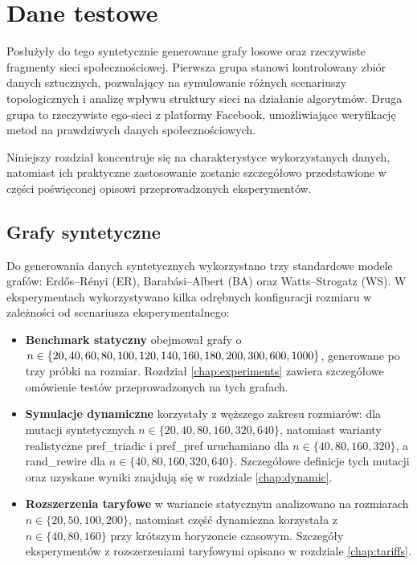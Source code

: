 \chapter{Dane testowe}\label{chap:testdata}
Posłużyły do tego syntetycznie generowane grafy losowe oraz rzeczywiste fragmenty sieci społecznościowej. Pierwsza grupa stanowi kontrolowany zbiór danych sztucznych, pozwalający na symulowanie różnych scenariuszy topologicznych i analizę wpływu struktury sieci na działanie algorytmów. Druga grupa to rzeczywiste ego-sieci z platformy Facebook, umożliwiające weryfikację metod na prawdziwych danych społecznościowych.

Niniejszy rozdział koncentruje się na charakterystyce wykorzystanych danych, natomiast ich praktyczne zastosowanie zostanie szczegółowo przedstawione w części poświęconej opisowi przeprowadzonych eksperymentów.

\section{Grafy syntetyczne}

Do generowania danych syntetycznych wykorzystano trzy standardowe modele grafów: Erd\H{o}s--Rényi (ER), Barabási--Albert (BA) oraz Watts--Strogatz (WS).
W eksperymentach wykorzystywano kilka odrębnych konfiguracji rozmiaru w zależności od scenariusza eksperymentalnego:
\begin{itemize}
  \item \textbf{Benchmark statyczny} obejmował grafy o $n \in \{20, 40, 60, 80, 100, 120, 140, 160, 180,\\200, 300, 600, 1000\}$, generowane po trzy próbki na rozmiar. Rozdział \ref{chap:experiments} zawiera szczegółowe omówienie testów przeprowadzonych na tych grafach.
  \item \textbf{Symulacje dynamiczne} korzystały z węższego zakresu rozmiarów: dla mutacji syntetycznych $n \in \{20, 40, 80, 160, 320, 640\}$, natomiast warianty realistyczne pref\_triadic i pref\_pref uruchamiano dla $n\in\{40,80,160,320\}$, a rand\_rewire dla $n\in\{40,80,160,320,640\}$. Szczegółowe definicje tych mutacji oraz uzyskane wyniki znajdują się w rozdziale \ref{chap:dynamic}.
  \item \textbf{Rozszerzenia taryfowe} w wariancie statycznym analizowano na rozmiarach $n \in \{20, 50, 100, 200\}$, natomiast część dynamiczna korzystała z $n \in \{40, 80, 160\}$ przy krótszym horyzoncie czasowym. Szczegóły eksperymentów z rozszerzeniami taryfowymi opisano w rozdziale \ref{chap:tariffs}.
\end{itemize}

